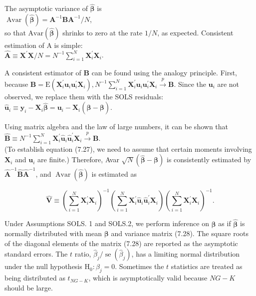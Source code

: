 \documentclass[10pt]{article}
\begin{document}
The asymptotic variance of $\hat{\boldsymbol{\beta}}$ is\\
$\operatorname{Avar}(\hat{\boldsymbol{\beta}})=\mathbf{A}^{-1} \mathbf{B} \mathbf{A}^{-1} / N$,\\
so that $\mathrm{Avar}(\hat{\boldsymbol{\beta}})$ shrinks to zero at the rate $1 / N$, as expected. Consistent estimation of A is simple:\\
$\hat{\mathbf{A}} \equiv \mathbf{X}^{\prime} \mathbf{X} / N=N^{-1} \sum_{i=1}^{N} \mathbf{X}_{i}^{\prime} \mathbf{X}_{i}$.

A consistent estimator of $\mathbf{B}$ can be found using the analogy principle. First, because $\mathbf{B}=\mathrm{E}\left(\mathbf{X}_{i}^{\prime} \mathbf{u}_{i} \mathbf{u}_{i}^{\prime} \mathbf{X}_{i}\right), N^{-1} \sum_{i=1}^{N} \mathbf{X}_{i}^{\prime} \mathbf{u}_{i} \mathbf{u}_{i}^{\prime} \mathbf{X}_{i} \xrightarrow{p} \mathbf{B}$. Since the $\mathbf{u}_{i}$ are not observed, we replace them with the SOLS residuals:\\
$\hat{\mathbf{u}}_{i} \equiv \mathbf{y}_{i}-\mathbf{X}_{i} \hat{\boldsymbol{\beta}}=\mathbf{u}_{i}-\mathbf{X}_{i}(\hat{\boldsymbol{\beta}}-\boldsymbol{\beta})$.

Using matrix algebra and the law of large numbers, it can be shown that\\
$\hat{\mathbf{B}} \equiv N^{-1} \sum_{i=1}^{N} \mathbf{X}_{i}^{\prime} \hat{\mathbf{u}}_{i} \hat{\mathbf{u}}_{i}^{\prime} \mathbf{X}_{i} \xrightarrow{p} \mathbf{B}$.\\
(To establish equation (7.27), we need to assume that certain moments involving $\mathbf{X}_{i}$ and $\mathbf{u}_{i}$ are finite.) Therefore, Avar $\sqrt{N}(\hat{\boldsymbol{\beta}}-\boldsymbol{\beta})$ is consistently estimated by $\hat{\mathbf{A}}^{-1} \hat{\mathbf{B}} \hat{\mathbf{A}}^{-1}$, and $\operatorname{Avar}(\hat{\boldsymbol{\beta}})$ is estimated as


\begin{equation*}
\hat{\mathbf{V}} \equiv\left(\sum_{i=1}^{N} \mathbf{X}_{i}^{\prime} \mathbf{X}_{i}\right)^{-1}\left(\sum_{i=1}^{N} \mathbf{X}_{i}^{\prime} \hat{\mathbf{u}}_{i} \hat{\mathbf{u}}_{i}^{\prime} \mathbf{X}_{i}\right)\left(\sum_{i=1}^{N} \mathbf{X}_{i}^{\prime} \mathbf{X}_{i}\right)^{-1} . \tag{7.28}
\end{equation*}


Under Assumptions SOLS. 1 and SOLS.2, we perform inference on $\boldsymbol{\beta}$ as if $\hat{\boldsymbol{\beta}}$ is normally distributed with mean $\boldsymbol{\beta}$ and variance matrix (7.28). The square roots of the diagonal elements of the matrix (7.28) are reported as the asymptotic standard errors. The $t$ ratio, $\hat{\beta}_{j} / \operatorname{se}\left(\hat{\beta}_{j}\right)$, has a limiting normal distribution under the null hypothesis $\mathrm{H}_{0}: \beta_{j}=0$. Sometimes the $t$ statistics are treated as being distributed as $t_{N G-K}$, which is asymptotically valid because $N G-K$ should be large.
\end{document}
